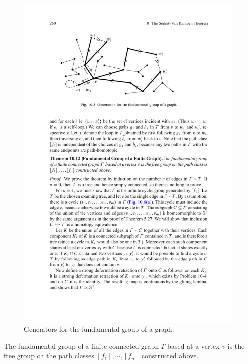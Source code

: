 \begin{figure}[htbp]
\centering
\includegraphics{fandamental-graph-1}
\caption{Generators for the fundamental group of a graph.}
\end{figure}
\begin{theorem}\label{fund graph}
The fundamental group of a finite connected graph $\Gamma$ based at a vertex $v$ is the free group on the path classes $[f_1],\cdots,[f_n]$ constructed above.
\end{theorem}
